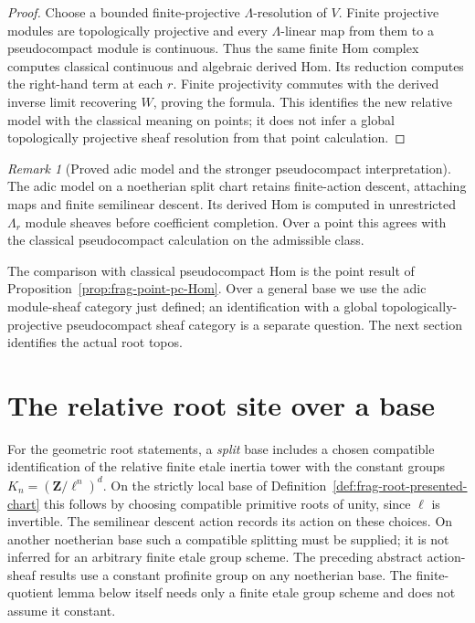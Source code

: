 \documentclass[11pt]{article}
\theoremstyle{definition}
\theoremstyle{remark}
\newtheorem{remark}[theorem]{Remark}
\begin{document}
\begin{proof}
Choose a bounded finite-projective $\Lambda$-resolution of $V$.
Finite projective modules are topologically projective and every
$\Lambda$-linear map from them to a pseudocompact module is continuous.
Thus the same finite Hom complex computes classical continuous and
algebraic derived Hom.  Its reduction computes the right-hand term
at each $r$.  Finite projectivity commutes with the derived inverse
limit recovering $W$, proving the formula.  This identifies the new
relative model with the classical meaning on points; it does not
infer a global topologically projective sheaf resolution from that
point calculation.
\end{proof}

\begin{remark}[Proved adic model and the stronger pseudocompact interpretation]
\label{rem:frag-F-iwasawa-remainder}
The adic model on a noetherian split chart retains finite-action
descent, attaching maps and finite semilinear descent.  Its derived Hom is computed in unrestricted $\Lambda_r$
module sheaves before coefficient completion.  Over a point this agrees
with the classical pseudocompact calculation on the admissible class.

The comparison with classical pseudocompact Hom is the point result
of Proposition~\ref{prop:frag-point-pc-Hom}.  Over a general base we
use the adic module-sheaf category just defined; an identification
with a global topologically-projective pseudocompact sheaf category
is a separate question.  The next section identifies the actual root topos.
\end{remark}


\section{The relative root site over a base}
\label{sec:frag-root-realization}

For the geometric root statements, a \emph{split} base includes a
chosen compatible identification of the relative finite etale
inertia tower with the constant groups $K_n=(\mathbf Z/\ell^n)^d$.
On the strictly local base of Definition~\ref{def:frag-root-presented-chart}
this follows by choosing compatible primitive roots of unity, since
$\ell$ is invertible.  The semilinear descent action records its
action on these choices.  On another noetherian base such a compatible
splitting must be supplied; it is not inferred for an arbitrary
finite etale group scheme.  The preceding abstract action-sheaf
results use a constant profinite group on any noetherian base.
The finite-quotient lemma below itself needs only a finite etale
group scheme and does not assume it constant.
\end{document}

